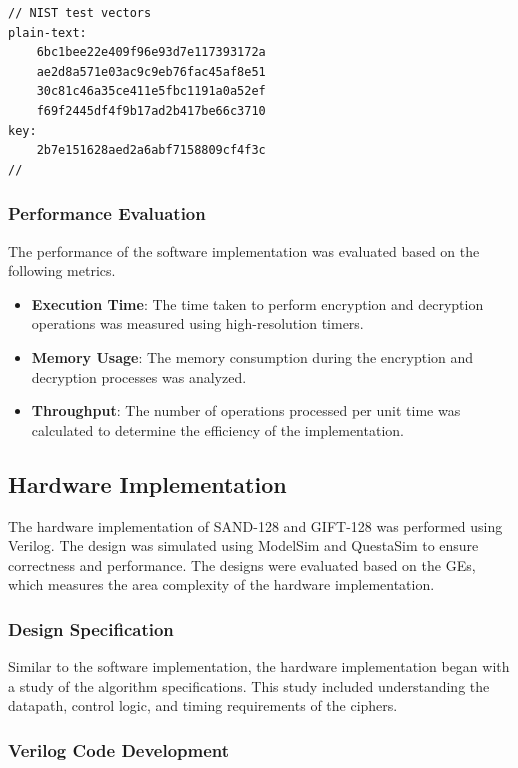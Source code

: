 \documentclass[conference]{IEEEtran}
\begin{document}
\begin{verbatim}
// NIST test vectors
plain-text:
    6bc1bee22e409f96e93d7e117393172a
    ae2d8a571e03ac9c9eb76fac45af8e51
    30c81c46a35ce411e5fbc1191a0a52ef
    f69f2445df4f9b17ad2b417be66c3710
key:
    2b7e151628aed2a6abf7158809cf4f3c
//
\end{verbatim}

\subsubsection{Performance Evaluation}

The performance of the software implementation was evaluated based on the following metrics.

\begin{itemize}
    \item \textbf{Execution Time}: The time taken to perform encryption and decryption operations was measured using high-resolution timers.
    \item \textbf{Memory Usage}: The memory consumption during the encryption and decryption processes was analyzed.
    \item \textbf{Throughput}: The number of operations processed per unit time was calculated to determine the efficiency of the implementation.
\end{itemize}

\subsection{Hardware Implementation}

The hardware implementation of SAND-128 and GIFT-128 was performed using Verilog. The design was simulated using ModelSim and QuestaSim to ensure correctness and performance. The designs were evaluated based on the GEs, which measures the area complexity of the hardware implementation.

\subsubsection{Design Specification}

Similar to the software implementation, the hardware implementation began with a study of the algorithm specifications. This study included understanding the datapath, control logic, and timing requirements of the ciphers.

\subsubsection{Verilog Code Development}
\end{document}
